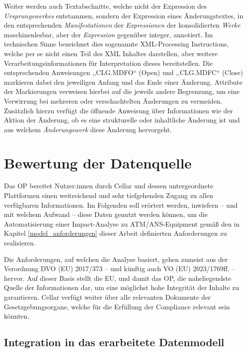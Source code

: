 Weiter werden auch Textabschnitte, welche nicht der Expression des \textit{Ursprungswerkes} entstammen, sondern der Expression eines Änderungstextes, in den entsprechenden \textit{Manifestationen} der \textit{Expressionen} der konsolidierten \textit{Werke} maschinenlesbar, aber der \textit{Expression} gegenüber integer, annotiert. 
Im technischen Sinne bezeichnet dies sogenannte \ac{XML}-Processing Instructions, welche per se nicht einen Teil des \ac{XML} Inhaltes darstellen, aber weitere Verarbeitungsinformationen für Interpretation dieses bereitstellen. 
Die entsprechenden Anweisungen ,,\textsf{CLG.MDFO}`` (Open) und ,,\textsf{CLG.MDFC}`` (Close) markieren dabei den jeweiligen Anfang und das Ende einer Änderung. 
Attribute der Markierungen verweisen hierbei auf die jeweils andere Begrenzung, um eine Verwirrung bei mehreren oder verschachtelten Änderungen zu vermeiden.
Zusätzlich hierzu verfügt die öffnende Anweisung über Informationen wie der Aktion der Änderung, ob es eine strukturelle oder inhaltliche Änderung ist und aus welchem \textit{Änderungswerk} diese Änderung hervorgeht. 
\cite[vgl. S. 76 -- 79]{eu_fmx4_proc}

    
    \section{Bewertung der Datenquelle}

Das \acf{OP} bereitet Nutzer:innen durch Cellar und dessen untergeordnete Plattformen einen weitreichend und sehr tiefgehenden Zugang zu allen verfügbaren Informationen.
Im Folgenden soll erörtert werden, inwiefern -- und mit welchem Aufwand -- diese Daten genutzt werden können, um die Automatisierung einer Impact-Analyse zu ATM/ANS-Equipment gemäß den in Kapitel \ref{model_anforderungen} dieser Arbeit definierten Anforderungen zu realisieren.

Die Anforderungen, auf welchen die Analyse basiert, gehen zumeist aus der Verordnung \ac{DVO} (\ac{EU}) 2017/373 -- und künftig auch \ac{VO} (\ac{EU}) 2023/1769ff. -- hervor. 
Auf dieser Basis stellt die \ac{EU}, und damit das \ac{OP}, die naheliegendste Quelle der Informationen dar, um eine möglichst hohe Integrität der Inhalte zu garantieren.
Cellar verfügt weiter über alle relevanten Dokumente der Gesetzgebungsorgane, welche für die Erfüllung der Compliance relevant sein könnten. 

\subsection{Integration in das erarbeitete Datenmodell}

